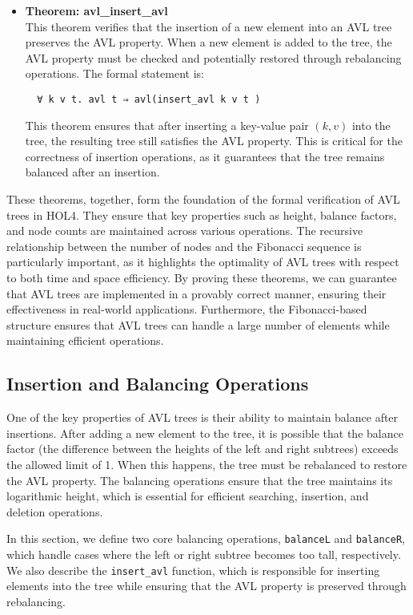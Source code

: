 \documentclass[12pt]{article}
\begin{document}
\begin{itemize}
  \item \textbf{Theorem: avl\_insert\_avl} \\
  This theorem verifies that the insertion of a new element into an AVL tree preserves the AVL property. When a new element is added to the tree, the AVL property must be checked and potentially restored through rebalancing operations. The formal statement is:
  \begin{verbatim}
  ∀ k v t. avl t ⇒ avl(insert_avl k v t )
  \end{verbatim}
  This theorem ensures that after inserting a key-value pair \( (k, v) \) into the tree, the resulting tree still satisfies the AVL property. This is critical for the correctness of insertion operations, as it guarantees that the tree remains balanced after an insertion.

\end{itemize}

These theorems, together, form the foundation of the formal verification of AVL trees in HOL4. They ensure that key properties such as height, balance factors, and node counts are maintained across various operations. The recursive relationship between the number of nodes and the Fibonacci sequence is particularly important, as it highlights the optimality of AVL trees with respect to both time and space efficiency. By proving these theorems, we can guarantee that AVL trees are implemented in a provably correct manner, ensuring their effectiveness in real-world applications. Furthermore, the Fibonacci-based structure ensures that AVL trees can handle a large number of elements while maintaining efficient operations.



\subsection{Insertion and Balancing Operations}

One of the key properties of AVL trees is their ability to maintain balance after insertions. After adding a new element to the tree, it is possible that the balance factor (the difference between the heights of the left and right subtrees) exceeds the allowed limit of 1. When this happens, the tree must be rebalanced to restore the AVL property. The balancing operations ensure that the tree maintains its logarithmic height, which is essential for efficient searching, insertion, and deletion operations.

In this section, we define two core balancing operations, \texttt{balanceL} and \texttt{balanceR}, which handle cases where the left or right subtree becomes too tall, respectively. We also describe the \texttt{insert\_avl} function, which is responsible for inserting elements into the tree while ensuring that the AVL property is preserved through rebalancing.
\end{document}

